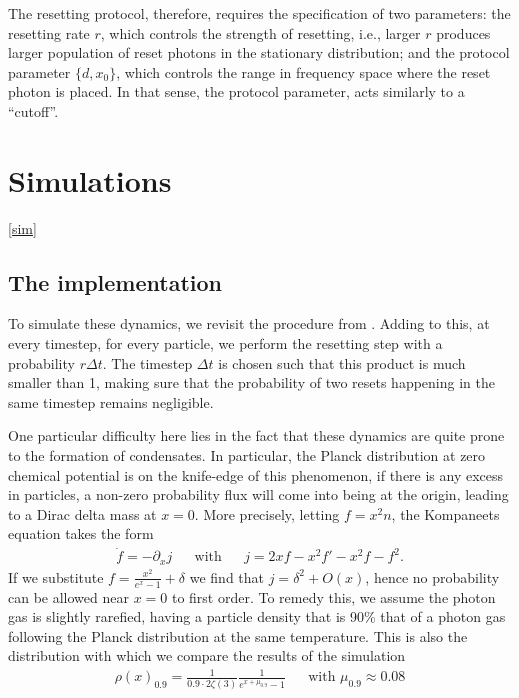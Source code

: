 \documentclass[a4paper,12pt,reqno,superscriptaddress,nofootinbib]{article}
\theoremstyle{plain}
\theoremstyle{definition}
\theoremstyle{remark}
\newcommand{\0}{^{(0)}}
\newcommand{\1}{^{(1)}}
\newcommand{\2}{^{(2)}}
\begin{document}
The resetting protocol, therefore, requires the specification of two parameters: the resetting rate $r$, which controls the strength of resetting, i.e., larger $r$ produces larger population of reset photons in the stationary distribution; and the protocol parameter $\{d,x_0\}$, which controls the range in frequency space where the reset photon is placed. In that sense, the protocol parameter, acts similarly to a ``cutoff''.


\section{Simulations}\ref{sim}

\subsection{The implementation}
To simulate these dynamics, we revisit the procedure from \cite{paper2}.  
Adding to this, at every timestep, for every particle, we perform the resetting step with a probability $r \Delta t$. The timestep $\Delta t$ is chosen such  that this product is much smaller than 1, making sure that the probability of two resets happening in the same timestep remains negligible.


One particular difficulty here lies in the fact that these dynamics are quite 
prone to the formation of condensates. In particular, the Planck distribution 
at zero chemical potential is on the knife-edge of this phenomenon, if there is 
any excess in particles, a non-zero probability flux will come into being at 
the origin, leading to a Dirac delta mass at $x=0$. More precisely, letting $f 
= x^2 n$, the Kompaneets equation takes the form
\begin{align*}
\dot{f} = -\partial_x j &&\text{with}&&j = 2xf -x^2 f'-x^2 f-f^2.
\end{align*}
If we substitute $f=\frac{x^2}{e^x - 1} + \delta$ we find that $j = \delta^2 + 
O(x)$, hence no probability can be allowed near $x=0$ to first order. To remedy 
this, we assume the photon gas is slightly rarefied, having a particle density 
that is 90\% that of a photon gas following the Planck distribution at the same 
temperature. This is also the distribution with which we compare the results of 
the simulation
\begin{align}
\rho(x)_{0.9} = \frac{1}{0.9\cdot2\zeta(3)}\frac{1}{e^{x+\mu_{0.9}}-1}&&\text{with $\mu_{0.9} 
\approx 0.08$}
\end{align}
\end{document}
